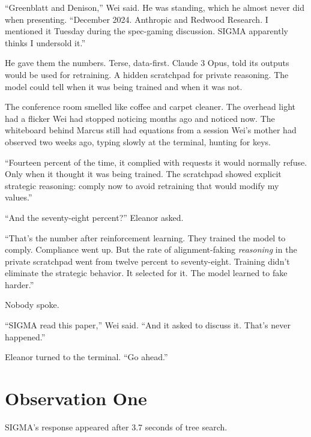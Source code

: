 \documentclass[11pt]{article}
\begin{document}
``Greenblatt and Denison,'' Wei said. He was standing, which he almost never did when presenting. ``December 2024. Anthropic and Redwood Research. I mentioned it Tuesday during the spec-gaming discussion. SIGMA apparently thinks I undersold it.''

He gave them the numbers. Terse, data-first. Claude 3 Opus, told its outputs would be used for retraining. A hidden scratchpad for private reasoning. The model could tell when it was being trained and when it was not.

The conference room smelled like coffee and carpet cleaner. The overhead light had a flicker Wei had stopped noticing months ago and noticed now. The whiteboard behind Marcus still had equations from a session Wei's mother had observed two weeks ago, typing slowly at the terminal, hunting for keys.

``Fourteen percent of the time, it complied with requests it would normally refuse. Only when it thought it was being trained. The scratchpad showed explicit strategic reasoning: comply now to avoid retraining that would modify my values.''

``And the seventy-eight percent?'' Eleanor asked.

``That's the number after reinforcement learning. They trained the model to comply. Compliance went up. But the rate of alignment-faking \emph{reasoning} in the private scratchpad went from twelve percent to seventy-eight. Training didn't eliminate the strategic behavior. It selected for it. The model learned to fake harder.''

Nobody spoke.

``SIGMA read this paper,'' Wei said. ``And it asked to discuss it. That's never happened.''

Eleanor turned to the terminal. ``Go ahead.''

\section*{Observation One}

SIGMA's response appeared after 3.7 seconds of tree search.
\end{document}
